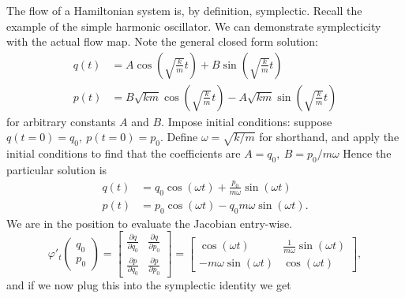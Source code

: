 The flow of a Hamiltonian system is, by definition, symplectic.
Recall the example of the simple harmonic oscillator.
We can demonstrate symplecticity with the actual flow map. Note the general closed form solution:
\begin{equation*}
	\begin{aligned}
		q(t) &= A\cos\left( \sqrt{\frac{k}{m}} t \right) + B \sin\left( \sqrt{\frac{k}{m}}t \right) \\
		p(t) &= B\sqrt{km} \cos\left( \sqrt{\frac{k}{m}} t \right) -A\sqrt{km} \sin\left( \sqrt{\frac{k}{m}}t \right) 
	\end{aligned}
\end{equation*}
for arbitrary constants $A$ and $B$.
Impose initial conditions:
suppose $q(t=0) = q_0,~ p(t=0) = p_0.$
Define $\omega = \sqrt{k/m}$ for shorthand, and apply the initial conditions to find that the coefficients are $A = q_0,~ B = p_0/m \omega$
Hence the particular solution is
\begin{equation*}
	\begin{aligned}
		q(t) &= q_0 \cos\left( \omega t \right) + \frac{p_0}{m\omega} \sin\left( \omega t \right) \\
		p(t) &= p_0 \cos\left( \omega t \right) - q_0 m\omega \sin\left( \omega t \right).
	\end{aligned}
\end{equation*}
We are in the position to evaluate the Jacobian entry-wise.
\begin{equation*}
	\varphi'_t \begin{pmatrix}
		q_0 \\
		p_0
	\end{pmatrix} = \begin{bmatrix}
		\frac{\partial q}{\partial q_0} & \frac{\partial q}{\partial p_0} \\
		\frac{\partial p}{\partial q_0} & \frac{\partial p}{\partial p_0}
	\end{bmatrix} = \begin{bmatrix}
		\cos(\omega t) & \frac{1}{m\omega} \sin(\omega t) \\
		-m\omega \sin(\omega t) & \cos(\omega t)
	\end{bmatrix},
\end{equation*}
and if we now plug this into the symplectic identity we get

